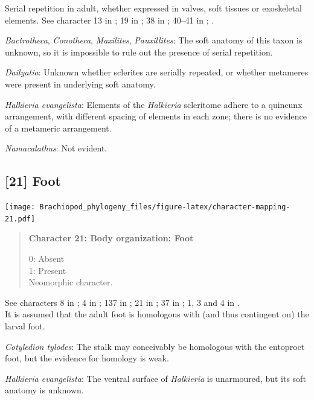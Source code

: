 \documentclass[openany]{book}
\begin{document}
Serial repetition in adult, whether expressed in valves, soft tissues or
exoskeletal elements. See character 13 in \citet{Rouse1999}; 19 in
\citet{Vinther2008}; 38 in \citet{Haszprunar1996}; 40--41 in
\citet{Sutton2012}; \citet{Wanninger2009}.

\hypertarget{Bactrotheca-coding-20}{}
\emph{Bactrotheca}, \emph{Conotheca}, \emph{Maxilites},
\emph{Pauxillites}: The soft anatomy of this taxon is unknown, so it is
impossible to rule out the presence of serial repetition.

\hypertarget{Dailyatia-coding-20}{}
\emph{Dailyatia}: Unknown whether sclerites are serially repeated, or
whether metameres were present in underlying soft anatomy.

\hypertarget{Halkieria_evangelista-coding-20}{}
\emph{Halkieria evangelista}: Elements of the \emph{Halkieria}
scleritome adhere to a quincunx arrangement, with different spacing of
elements in each zone; there is no evidence of a metameric arrangement.

\hypertarget{Namacalathus-coding-20}{}
\emph{Namacalathus}: Not evident.

\subsection*{{[}21{]} Foot}\label{foot}

\texttt{[image: Brachiopod\_phylogeny\_files/figure-latex/character-mapping-21.pdf]}

\begin{quote}
\textbf{Character 21: Body organization: Foot}

0: Absent\\
1: Present\\
Neomorphic character.
\end{quote}

See characters 8 in \citet{Haszprunar1996}; 4 in \citet{Vinther2008};
137 in \citet{Rouse1999}; 21 in \citet{BucklandNicks2008}; 37 in
\citet{Sutton2012}; 1, 3 and 4 in \citet{Haszprunar2008}.\\
It is assumed that the adult foot is homologous with (and thus
contingent on) the larval foot.

\hypertarget{Cotyledion_tylodes-coding-21}{}
\emph{Cotyledion tylodes}: The stalk may conceivably be homologous with
the entoproct foot, but the evidence for homology is weak.

\hypertarget{Halkieria_evangelista-coding-21}{}
\emph{Halkieria evangelista}: The ventral surface of \emph{Halkieria} is
unarmoured, but its soft anatomy is unknown.
\end{document}
